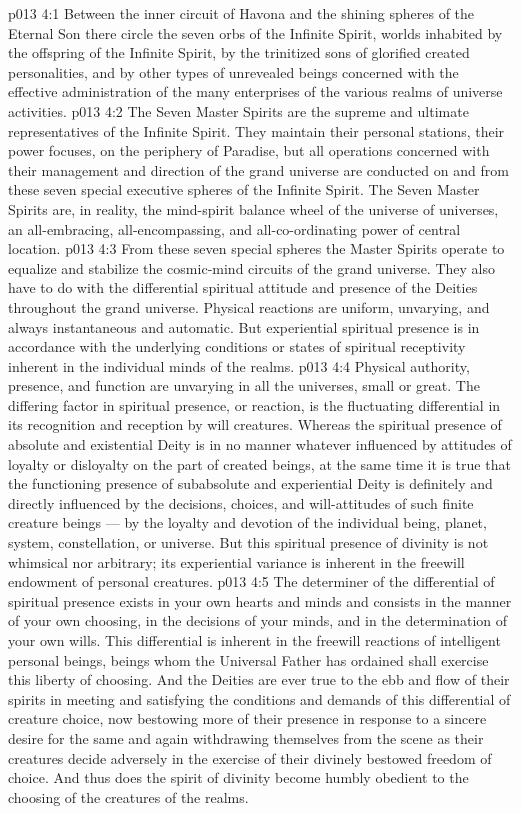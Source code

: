 \vs p013 4:1 Between the inner circuit of Havona and the shining spheres of the Eternal Son there circle the seven orbs of the Infinite Spirit, worlds inhabited by the offspring of the Infinite Spirit, by the trinitized sons of glorified created personalities, and by other types of unrevealed beings concerned with the effective administration of the many enterprises of the various realms of universe activities.
\vs p013 4:2 The Seven Master Spirits are the supreme and ultimate representatives of the Infinite Spirit. They maintain their personal stations, their power focuses, on the periphery of Paradise, but all operations concerned with their management and direction of the grand universe are conducted on and from these seven special executive spheres of the Infinite Spirit. The Seven Master Spirits are, in reality, the mind\hyp{}spirit balance wheel of the universe of universes, an all\hyp{}embracing, all\hyp{}encompassing, and all\hyp{}co\hyp{}ordinating power of central location.
\vs p013 4:3 From these seven special spheres the Master Spirits operate to equalize and stabilize the cosmic\hyp{}mind circuits of the grand universe. They also have to do with the differential spiritual attitude and presence of the Deities throughout the grand universe. Physical reactions are uniform, unvarying, and always instantaneous and automatic. But experiential spiritual presence is in accordance with the underlying conditions or states of spiritual receptivity inherent in the individual minds of the realms.
\vs p013 4:4 \pc Physical authority, presence, and function are unvarying in all the universes, small or great. The differing factor in spiritual presence, or reaction, is the fluctuating differential in its recognition and reception by will creatures. Whereas the spiritual presence of absolute and existential Deity is in no manner whatever influenced by attitudes of loyalty or disloyalty on the part of created beings, at the same time it is true that the functioning presence of subabsolute and experiential Deity is definitely and directly influenced by the decisions, choices, and will\hyp{}attitudes of such finite creature beings --- by the loyalty and devotion of the individual being, planet, system, constellation, or universe. But this spiritual presence of divinity is not whimsical nor arbitrary; its experiential variance is inherent in the freewill endowment of personal creatures.
\vs p013 4:5 The determiner of the differential of spiritual presence exists in your own hearts and minds and consists in the manner of your own choosing, in the decisions of your minds, and in the determination of your own wills. This differential is inherent in the freewill reactions of intelligent personal beings, beings whom the Universal Father has ordained shall exercise this liberty of choosing. And the Deities are ever true to the ebb and flow of their spirits in meeting and satisfying the conditions and demands of this differential of creature choice, now bestowing more of their presence in response to a sincere desire for the same and again withdrawing themselves from the scene as their creatures decide adversely in the exercise of their divinely bestowed freedom of choice. And thus does the spirit of divinity become humbly obedient to the choosing of the creatures of the realms.
